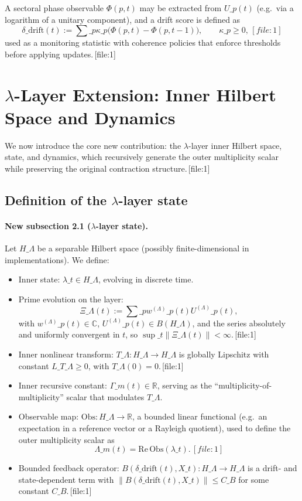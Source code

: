 \documentclass[11pt]{article}
\begin{document}
A sectoral phase observable $\Phi(p,t)$ may be extracted from $U\_p(t)$ (e.g.\ via a logarithm of a unitary component), and a drift score is defined as
\[
\delta\_{\mathrm{drift}}(t) := \sum\_p \kappa\_p\bigl(\Phi(p,t)-\Phi(p,t-1)\bigr),\qquad \kappa\_p\ge 0,\,[file:1]
\]
used as a monitoring statistic with coherence policies that enforce thresholds before applying updates.\,[file:1]

\section{$\lambda$-Layer Extension: Inner Hilbert Space and Dynamics}

We now introduce the core new contribution: the $\lambda$-layer inner Hilbert space, state, and dynamics, which recursively generate the outer multiplicity scalar while preserving the original contraction structure.\,[file:1]

\subsection{Definition of the $\lambda$-layer state}

\paragraph{New subsection 2.1 ($\lambda$-layer state).} Let $H\_\Lambda$ be a separable Hilbert space (possibly finite-dimensional in implementations). We define:

\begin{itemize}[nosep]
  \item Inner state: $\lambda\_t\in H\_\Lambda$, evolving in discrete time.
  \item Prime evolution on the layer:
  \[
  \Xi\_\Lambda(t) := \sum\_p w^{(\Lambda)}\_p(t) U^{(\Lambda)}\_p(t),
  \]
  with $w^{(\Lambda)}\_p(t)\in\mathbb{C}$, $U^{(\Lambda)}\_p(t)\in B(H\_\Lambda)$, and the series absolutely and uniformly convergent in $t$, so $\sup\_t\|\Xi\_\Lambda(t)\|<\infty$.\,[file:1]
  \item Inner nonlinear transform: $T\_\Lambda:H\_\Lambda\to H\_\Lambda$ is globally Lipschitz with constant $L\_{T\_\Lambda}\ge 0$, with $T\_\Lambda(0)=0$.\,[file:1]
  \item Inner recursive constant: $\Gamma\_m(t)\in\mathbb{R}$, serving as the ``multiplicity-of-multiplicity'' scalar that modulates $T\_\Lambda$.
  \item Observable map: $\mathrm{Obs}:H\_\Lambda\to\mathbb{R}$, a bounded linear functional (e.g.\ an expectation in a reference vector or a Rayleigh quotient), used to define the outer multiplicity scalar as
  \[
  \Lambda\_m(t) = \mathrm{Re}\,\mathrm{Obs}(\lambda\_t).\,[file:1]
  \]
  \item Bounded feedback operator: $B(\delta\_{\mathrm{drift}}(t),X\_t):H\_\Lambda\to H\_\Lambda$ is a drift- and state-dependent term with $\|B(\delta\_{\mathrm{drift}}(t),X\_t)\|\le C\_B$ for some constant $C\_B$.\,[file:1]
\end{itemize}
\end{document}
